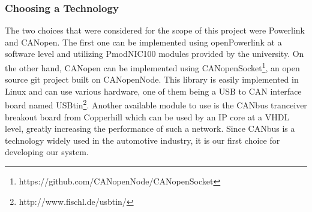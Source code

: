 \subsubsection{Choosing a Technology}
The two choices that were considered for the scope of this project were Powerlink and CANopen. The first one can be implemented using openPowerlink at a software level and utilizing PmodNIC100 modules provided by the university. On the other hand, CANopen can be implemented using CANopenSocket\footnote{https://github.com/CANopenNode/CANopenSocket}, an open source git project built on CANopenNode. This library is easily implemented in Linux and can use various hardware, one of them being a USB to CAN interface board named USBtin\footnote{http://www.fischl.de/usbtin/}. Another available module to use is the CANbus tranceiver breakout board from Copperhill which can be used by an IP core at a VHDL level, greatly increasing the performance of such a network. Since CANbus is a technology widely used in the automotive industry, it is our first choice for developing our system.




